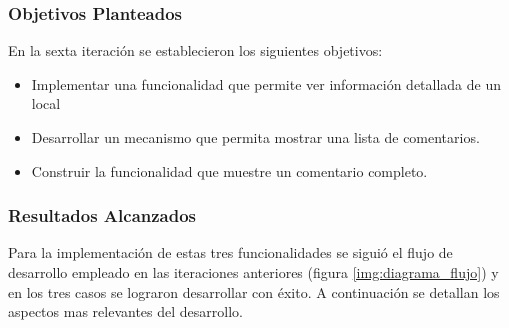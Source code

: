\subsubsection{Objetivos Planteados} 
En la sexta iteración se establecieron los siguientes objetivos:
\begin{itemize}
\item Implementar una funcionalidad que permite ver información detallada de un local
\item Desarrollar un mecanismo que permita mostrar una lista de comentarios.
\item Construir la funcionalidad que muestre un comentario completo.
\end{itemize}

\subsubsection{Resultados Alcanzados}

Para la implementación de estas tres funcionalidades se siguió el flujo de desarrollo empleado en las iteraciones anteriores (figura \ref{img:diagrama_flujo}) y en los tres casos se lograron desarrollar con éxito. A continuación se detallan los aspectos mas relevantes del desarrollo.

